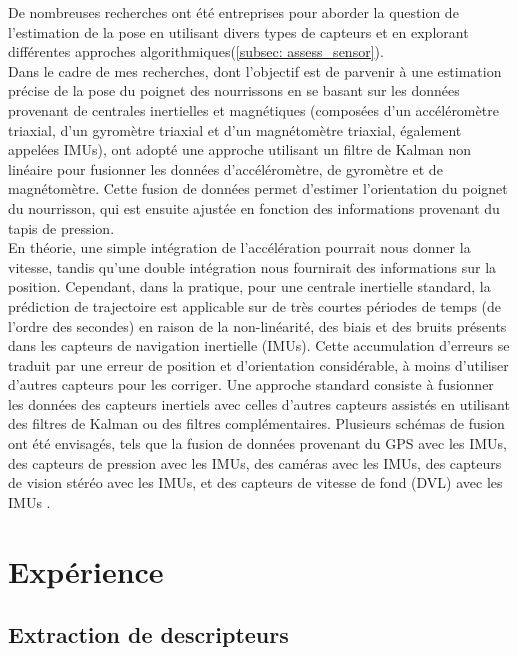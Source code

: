 \documentclass[5pt]{article}
\begin{document}
De nombreuses recherches ont été entreprises pour aborder la question de l'estimation de la pose en utilisant divers types de capteurs et en explorant différentes approches algorithmiques(\ref{subsec: assess_sensor}).\\ 
Dans le cadre de mes recherches, dont l'objectif est de parvenir à une estimation précise de la pose du poignet des nourrissons en se basant sur les données provenant de centrales inertielles et magnétiques (composées d'un accéléromètre triaxial, d'un gyromètre triaxial et d'un magnétomètre triaxial, également appelées IMUs),  \textcite{rihar_caretoy_2016} ont adopté une approche utilisant un filtre de Kalman non linéaire pour fusionner les données d'accéléromètre, de gyromètre et de magnétomètre. Cette fusion de données permet d'estimer l'orientation du poignet du nourrisson, qui est ensuite ajustée en fonction des informations provenant du tapis de pression.\\
En théorie, une simple intégration de l'accélération pourrait nous donner la vitesse, tandis qu'une double intégration nous fournirait des informations sur la position. Cependant, dans la pratique, pour une centrale inertielle standard, la prédiction de trajectoire est applicable sur de très courtes périodes de temps (de l'ordre des secondes) en raison de la non-linéarité, des biais et des bruits présents dans les capteurs de navigation inertielle (IMUs). Cette accumulation d'erreurs se traduit par une erreur de position et d'orientation considérable, à moins d'utiliser d'autres capteurs pour les corriger. Une approche standard consiste à fusionner les données des capteurs inertiels avec celles d'autres capteurs assistés en utilisant des filtres de Kalman ou des filtres complémentaires. Plusieurs schémas de fusion ont été envisagés, tels que la fusion de données provenant du GPS avec les IMUs, des capteurs de pression avec les IMUs, des caméras avec les IMUs, des capteurs de vision stéréo avec les IMUs, et des capteurs de vitesse de fond (DVL) avec les IMUs \cite{noauthor_comparative_2014}. 



\newpage
\section{Expérience}
\label{expé}
\subsection{Extraction de descripteurs}
\end{document}
